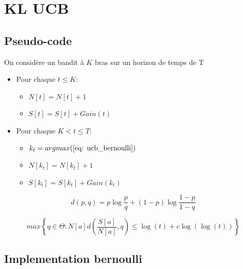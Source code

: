 \documentclass[letterpaper,11pt]{article}
\begin{document}
\section{KL UCB}


\subsection{Pseudo-code}
On considère un bandit à $K$ bras sur un horizon de temps de T
\begin{itemize}
\setlength\itemsep{0.2cm}

\item Pour chaque $t\leq K:$

\begin{itemize}

\item $N[t] = N[t]+1$

\item $S[t] = S[t]+Gain(t)$

\end{itemize}

\item Pour chaque $K < t \leq T:$

\begin{itemize}

\item $k_t = argmax(\ref{eq: ucb_bernoulli})$

\item $N[k_t] = N[k_t]+1$

\item $S[k_t] = S[k_t]+Gain(k_t)$

\end{itemize}


\end{itemize}

\begin{equation}
d(p,q) = p \log \frac{p}{q} + (1-p) \log \frac{1-p}{1-q}
\end{equation}\label{eq: differentien_bernoulli}

\begin{equation}
max \left\{ q \in \Theta : N[a] d\left(\frac{S[a]}{N[a]},q\right) \leq \log(t) + c \log(\log(t)) \right\}
\label{eq: ucb_bernoulli}
\end{equation}

\subsection{Implementation bernoulli}
\end{document}
